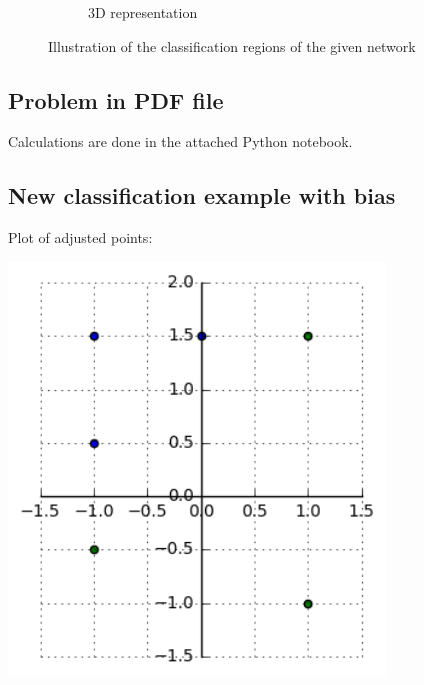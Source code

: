 \documentclass[paper=a4, fontsize=11pt]{scrartcl} %
\begin{document}
\begin{figure}[h!]
\begin{subfigure}[b]{0.65\textwidth}
            \caption{3D representation}
        \end{subfigure}
        \caption{Illustration of the classification regions of the given network}
    \end{figure}

    \subsection*{Problem in PDF file}
    Calculations are done in the attached Python notebook.

    \subsection*{New classification example with bias}
    Plot of adjusted points:
    \begin{center}
        \includegraphics[width=10.0cm]{../images/NN_MinhNguyen_20161010_ex5.png} %
    \end{center}
\end{document}
